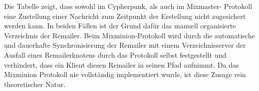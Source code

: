 Die Tabelle zeigt, dass sowohl im Cypherpunk, als auch im Mixmaster- Protokoll eine Zustellung einer Nachricht zum Zeitpunkt der Erstellung nicht zugesichert werden kann. In beiden Fällen ist der Grund dafür das manuell organisierte Verzeichnis der Remailer. Beim Mixminion-Protokoll wird durch die automatische und dauerhafte Synchronisierung der Remailer mit einem Verzeichnisserver der Ausfall eines Remailerknotens durch das Protokoll selbst festgestellt und verhindert, dass ein Klient diesen Remailer in seinen Pfad aufnimmt. Da das Mixminion Protokoll nie vollständig implementiert wurde, ist diese Zusage rein theoretischer Natur.